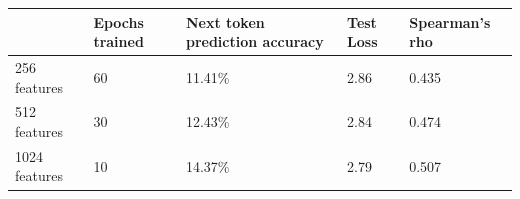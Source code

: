 \begin{table}[!ht]
\begin{tabular}{|l|l|l|l|l|}
\hline
              & Epochs trained & Next token prediction accuracy & Test Loss & Spearman's rho\\ \hline
256 features  & 60             & 11.41\%                        & 2.86      & 0.435         \\ \hline
512 features  & 30             & 12.43\%                        & 2.84      & 0.474         \\ \hline
1024 features & 10             & 14.37\%                        & 2.79      & 0.507         \\ \hline
\end{tabular}
\end{table}
